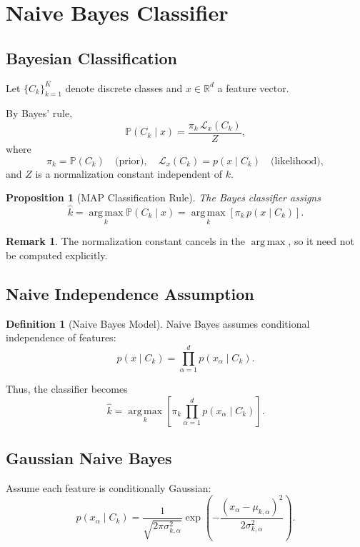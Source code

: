 \documentclass[12pt,oneside]{book}
\numberwithin{equation}{section}
\theoremstyle{definition}
\newtheorem{definition}{Definition}[section]
\newtheorem{remark}{Remark}[section]
\theoremstyle{plain}
\newtheorem{proposition}{Proposition}[section]
\theoremstyle{remark}
\newcommand{\R}{\mathbb{R}}
\newcommand{\Prob}{\mathbb{P}}
\newcommand{\argmax}{\operatorname*{arg\,max}}
\begin{document}
\section{Naive Bayes Classifier}

\subsection{Bayesian Classification}

Let $\{C_k\}_{k=1}^K$ denote discrete classes and $x \in \R^d$ a feature vector.

By Bayes' rule,
\[
\Prob(C_k \mid x)
=
\frac{\pi_k \, \mathcal{L}_x(C_k)}{Z},
\]
where
\[
\pi_k = \Prob(C_k)
\quad \text{(prior)},
\quad
\mathcal{L}_x(C_k)=p(x \mid C_k)
\quad \text{(likelihood)},
\]
and $Z$ is a normalization constant independent of $k$.

\begin{proposition}[MAP Classification Rule]
The Bayes classifier assigns
\[
\hat{k}
=
\argmax_k \Prob(C_k \mid x)
=
\argmax_k \left[ \pi_k \, p(x \mid C_k) \right].
\]
\end{proposition}

\begin{remark}
The normalization constant cancels in the $\argmax$, so it need not be computed explicitly.
\end{remark}

\subsection{Naive Independence Assumption}

\begin{definition}[Naive Bayes Model]
Naive Bayes assumes conditional independence of features:
\[
p(x \mid C_k)
=
\prod_{\alpha=1}^d p(x_\alpha \mid C_k).
\]
\end{definition}

Thus, the classifier becomes
\[
\hat{k}
=
\argmax_k
\left[
\pi_k \prod_{\alpha=1}^d p(x_\alpha \mid C_k)
\right].
\]

\subsection{Gaussian Naive Bayes}

Assume each feature is conditionally Gaussian:
\[
p(x_\alpha \mid C_k)
=
\frac{1}{\sqrt{2\pi\sigma_{k,\alpha}^2}}
\exp\left(
-\frac{(x_\alpha-\mu_{k,\alpha})^2}{2\sigma_{k,\alpha}^2}
\right).
\]
\end{document}
